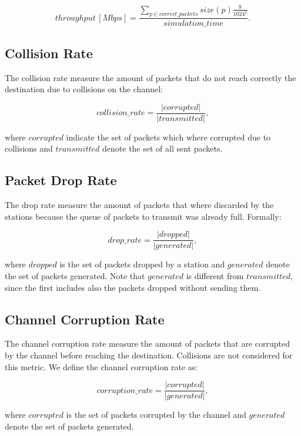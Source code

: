 \begin{equation}
    throughput \, [\si{Mbps}] = \frac{\sum_{p \in correct\_packets} size(p) \frac{8}{1024^2}}{simulation\_time} .
\end{equation}


\subsection{Collision Rate}
The collision rate measure the amount of packets that do not reach correctly the destination due to collisions on the channel:

\begin{equation}
    collision\_rate = \frac{|corrupted|}{|transmitted|},
\end{equation}

where $corrupted$ indicate the set of packets which where corrupted due to collisions and $transmitted$ denote the set of all sent packets.


\subsection{Packet Drop Rate}
The drop rate measure the amount of packets that where discarded by the stations because the queue of packets to transmit was already full.
Formally:

\begin{equation}
    drop\_rate = \frac{|dropped|}{|generated|},
\end{equation}

where $dropped$ is the set of packets dropped by a station and $generated$ denote the set of packets generated.
Note that $generated$ is different from $transmitted$, since the first includes also the packets dropped without sending them.


\subsection{Channel Corruption Rate}
The channel corruption rate measure the amount of packets that are corrupted by the channel before reaching the destination. Collisions are not considered for this metric.
We define the channel corruption rate as:

\begin{equation}
    corruption\_rate = \frac{|corrupted|}{|generated|},
\end{equation}

where $corrupted$ is the set of packets corrupted by the channel and $generated$ denote the set of packets generated.
